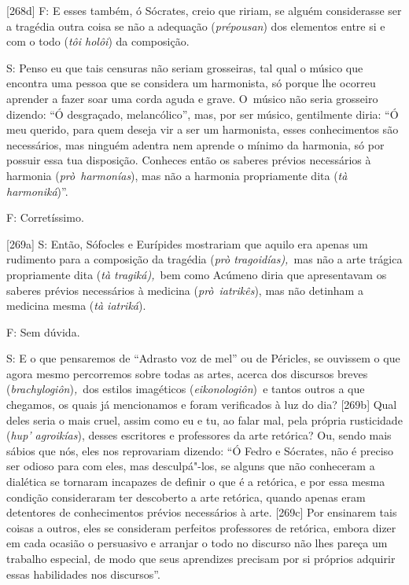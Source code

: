  

[268d] F: E esses também, ó Sócrates, creio que ririam, se alguém
considerasse ser a tragédia outra coisa se não a adequação
(\emph{prépousan}) dos elementos entre si e com o todo (\emph{tôi
holôi}) da composição.

 

S: Penso eu que tais censuras não seriam grosseiras, tal qual o músico
que encontra uma pessoa que se considera um harmonista, só porque lhe
ocorreu aprender a fazer soar uma corda aguda e grave. O~músico não
seria grosseiro dizendo: ``Ó desgraçado, melancólico'', mas, por ser
músico, gentilmente diria: ``Ó meu querido, para quem deseja vir a ser
um harmonista, esses conhecimentos são necessários, mas ninguém adentra
nem aprende o mínimo da harmonia, só por possuir essa tua disposição.
Conheces então os saberes prévios necessários à harmonia
(\emph{prò}~\emph{harmonías}), mas não a harmonia propriamente dita
(\emph{tà harmoniká})''.

 

F: Corretíssimo.

 

[269a] S: Então, Sófocles e Eurípides mostrariam que aquilo era
apenas um rudimento para a composição da tragédia (\emph{prò
tragoidías),~}mas não a arte trágica propriamente dita (\emph{tà
tragiká),~}bem como Acúmeno diria que apresentavam os saberes prévios
necessários à medicina (\emph{prò}~\emph{iatrikês}), mas não detinham a
medicina mesma (\emph{tà iatriká}).

 

F: Sem dúvida.

 

S: E o que pensaremos de ``Adrasto voz de mel'' ou de Péricles, se
ouvissem o que agora mesmo percorremos sobre todas as artes, acerca dos
discursos breves (\emph{brachylogiôn})\emph{,~}dos estilos imagéticos
(\emph{eikonologiôn})\emph{~}e tantos outros a que chegamos, os quais já
mencionamos e foram verificados à luz do dia? [269b] Qual deles
seria o mais cruel, assim como eu e tu, ao falar mal, pela própria
rusticidade (\emph{hup' agroikías}), desses escritores e professores da
arte retórica? Ou, sendo mais sábios que nós, eles nos reprovariam
dizendo: ``Ó Fedro e Sócrates, não é preciso ser odioso para com eles,
mas desculpá"-los, se alguns que não conheceram a dialética se tornaram
incapazes de definir o que é a retórica, e por essa mesma condição
consideraram ter descoberto a arte retórica, quando apenas eram
detentores de conhecimentos prévios necessários à arte. [269c] Por
ensinarem tais coisas a outros, eles se consideram perfeitos professores
de retórica, embora dizer em cada ocasião o persuasivo e arranjar o todo
no discurso não lhes pareça um trabalho especial, de modo que seus
aprendizes precisam por si próprios adquirir essas habilidades nos
discursos''.

